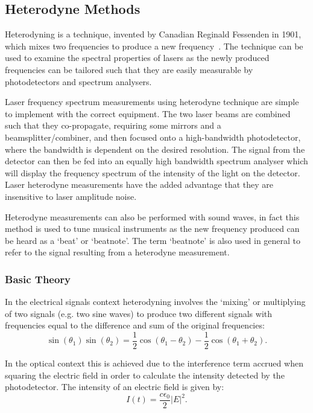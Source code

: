 \subsection{Heterodyne Methods}

Heterodyning is a technique, invented by Canadian Reginald Fessenden in 1901, which mixes two frequencies to produce a new frequency~\cite{cooper_physics_2001}.
The technique can be used to examine the spectral properties of lasers as the newly produced frequencies can be tailored such that they are easily measurable by photodetectors and spectrum analysers.

Laser frequency spectrum measurements using heterodyne technique are simple to implement with the correct equipment.
The two laser beams are combined such that they co-propagate, requiring some mirrors and a beamsplitter/combiner, and then focused onto a high-bandwidth photodetector, where the bandwidth is dependent on the desired resolution.
The signal from the detector can then be fed into an equally high bandwidth spectrum analyser which will display the frequency spectrum of the intensity of the light on the detector.
Laser heterodyne measurements have the added advantage that they are insensitive to laser amplitude noise.

Heterodyne measurements can also be performed with sound waves, in fact this method is used to tune musical instruments as the new frequency produced can be heard as a `beat' or `beatnote'.
The term `beatnote' is also used in general to refer to the signal resulting from a heterodyne measurement.

\subsubsection{Basic Theory}
In the electrical signals context heterodyning involves the `mixing' or multiplying of two signals (e.g. two sine waves) to produce two different signals with frequencies equal to the difference and sum of the original frequencies:
\begin{equation}
\sin(\theta_1)\sin(\theta_2) = \frac{1}{2} \cos(\theta_1-\theta_2) - \frac{1}{2} \cos(\theta_1+\theta_2).
\end{equation}

In the optical context this is achieved due to the interference term accrued when squaring the electric field in order to calculate the intensity detected by the photodetector. The intensity of an electric field is given by:
\begin{equation}
I(t) = \frac{c\epsilon_0}{2}|E|^2.
\end{equation}

